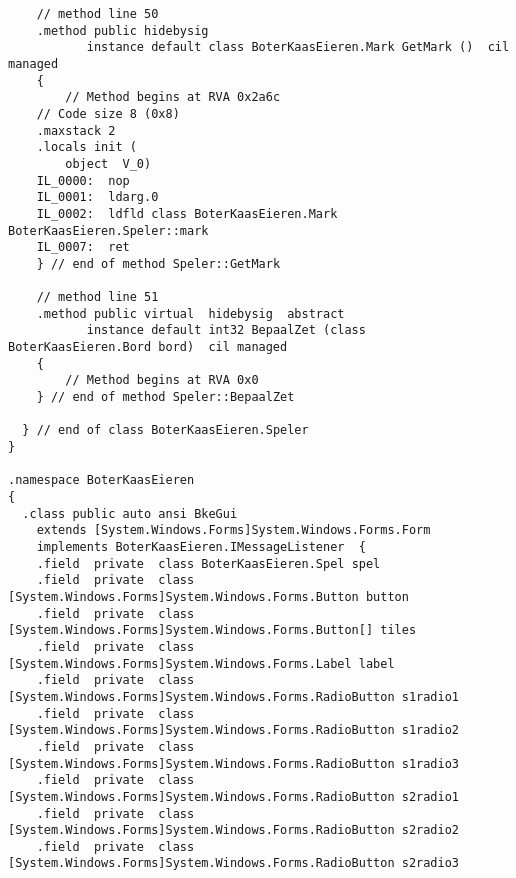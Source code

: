 \begin{lstlisting}
    // method line 50
    .method public hidebysig 
           instance default class BoterKaasEieren.Mark GetMark ()  cil managed 
    {
        // Method begins at RVA 0x2a6c
	// Code size 8 (0x8)
	.maxstack 2
	.locals init (
		object	V_0)
	IL_0000:  nop 
	IL_0001:  ldarg.0 
	IL_0002:  ldfld class BoterKaasEieren.Mark BoterKaasEieren.Speler::mark
	IL_0007:  ret 
    } // end of method Speler::GetMark

    // method line 51
    .method public virtual  hidebysig  abstract 
           instance default int32 BepaalZet (class BoterKaasEieren.Bord bord)  cil managed 
    {
        // Method begins at RVA 0x0
    } // end of method Speler::BepaalZet

  } // end of class BoterKaasEieren.Speler
}

.namespace BoterKaasEieren
{
  .class public auto ansi BkeGui
  	extends [System.Windows.Forms]System.Windows.Forms.Form
  	implements BoterKaasEieren.IMessageListener  {
    .field  private  class BoterKaasEieren.Spel spel
    .field  private  class [System.Windows.Forms]System.Windows.Forms.Button button
    .field  private  class [System.Windows.Forms]System.Windows.Forms.Button[] tiles
    .field  private  class [System.Windows.Forms]System.Windows.Forms.Label label
    .field  private  class [System.Windows.Forms]System.Windows.Forms.RadioButton s1radio1
    .field  private  class [System.Windows.Forms]System.Windows.Forms.RadioButton s1radio2
    .field  private  class [System.Windows.Forms]System.Windows.Forms.RadioButton s1radio3
    .field  private  class [System.Windows.Forms]System.Windows.Forms.RadioButton s2radio1
    .field  private  class [System.Windows.Forms]System.Windows.Forms.RadioButton s2radio2
    .field  private  class [System.Windows.Forms]System.Windows.Forms.RadioButton s2radio3


\end{lstlisting}
